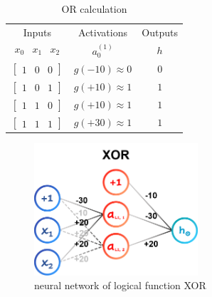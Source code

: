 \begin{itemize}
    \begin{table}[H]
        \renewcommand\arraystretch{1.5}
        \caption{OR calculation}
        \centering
        \begin{tabular}{ccc}
            \hline\hline %
            Inputs                                                     & Activations        & Outputs    \\ 
            $\begin{array}{ccc} x_0 & x_1 & x_2 \end{array}$           & $a^{(1)}_0$        & $h$        \\ 
            \hline %
            $\left[{\begin{array}{ccc} 1 & 0 & 0 \end{array}}\right]$  & $g(-10) \approx 0$ & $0$        \\ 
            $\left[{\begin{array}{ccc} 1 & 0 & 1 \end{array}}\right]$  & $g(+10) \approx 1$ & $1$        \\
            $\left[{\begin{array}{ccc} 1 & 1 & 0 \end{array}}\right]$  & $g(+10) \approx 1$ & $1$        \\
            $\left[{\begin{array}{ccc} 1 & 1 & 1 \end{array}}\right]$  & $g(+30) \approx 1$ & $1$        \\[1ex]
            \hline\hline %
        \end{tabular}
    \end{table}
    
    \begin{figure}[H]
        \centering
        \includegraphics[width=2.4in]{./images/logicGate_XOR.png}
        \caption{neural network of logical function XOR}
    \end{figure}
    

\end{itemize}
